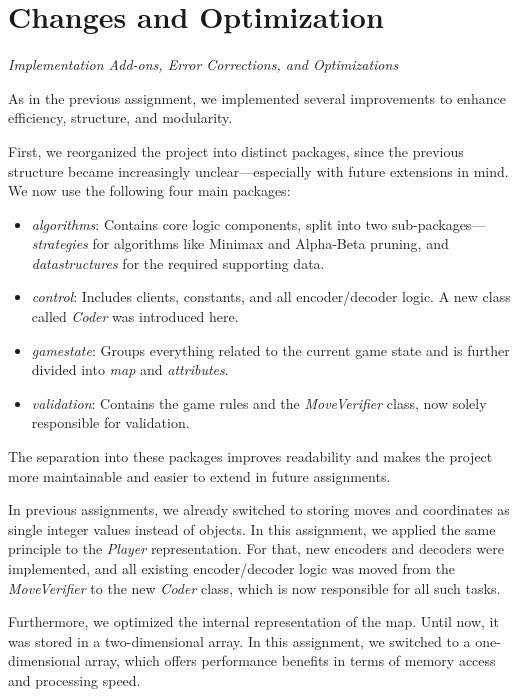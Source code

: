 \section*{Changes and Optimization}
\textit{Implementation Add-ons, Error Corrections, and Optimizations}

\noindent As in the previous assignment, we implemented several improvements to enhance efficiency, structure, and modularity.

\noindent First, we reorganized the project into distinct packages, since the previous structure became increasingly unclear—especially with future extensions in mind. We now use the following four main packages:

\begin{itemize}
\item \textit{algorithms}: Contains core logic components, split into two sub-packages—\textit{strategies} for algorithms like Minimax and Alpha-Beta pruning, and \textit{datastructures} for the required supporting data.
\item \textit{control}: Includes clients, constants, and all encoder/decoder logic. A new class called \textit{Coder} was introduced here.
\item \textit{gamestate}: Groups everything related to the current game state and is further divided into \textit{map} and \textit{attributes}.
\item \textit{validation}: Contains the game rules and the \textit{MoveVerifier} class, now solely responsible for validation.
\end{itemize}

\noindent The separation into these packages improves readability and makes the project more maintainable and easier to extend in future assignments.

\noindent In previous assignments, we already switched to storing moves and coordinates as single integer values instead of objects. In this assignment, we applied the same principle to the \textit{Player} representation. For that, new encoders and decoders were implemented, and all existing encoder/decoder logic was moved from the \textit{MoveVerifier} to the new \textit{Coder} class, which is now responsible for all such tasks.

\noindent Furthermore, we optimized the internal representation of the map. Until now, it was stored in a two-dimensional array. In this assignment, we switched to a one-dimensional array, which offers performance benefits in terms of memory access and processing speed.

